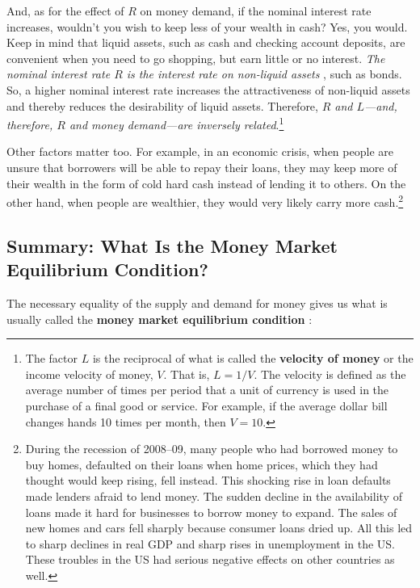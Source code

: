 \documentclass[
  letterpaper,
]{book}
\theoremstyle{plain}
\theoremstyle{remark}
\begin{document}
And, as for the effect of \(R\) on money demand, if the nominal interest
rate increases, wouldn't you wish to keep less of your wealth in cash?
Yes, you would. Keep in mind that liquid assets, such as cash and
checking account deposits, are convenient when you need to go shopping,
but earn little or no interest. \emph{The nominal interest rate \(R\) is
the interest rate on non-liquid assets} ,
such as bonds. So, a higher nominal interest rate increases the
attractiveness of non-liquid assets and thereby reduces the desirability
of liquid assets. Therefore, \emph{\(R\) and \(L\)---and, therefore,
\(R\) and money demand---are inversely related}.\footnote{The factor
  \(L\) is the reciprocal of what is called the \textbf{velocity of
  money} or the income velocity of money, \(V\). That is, \(L=1/V\). The
  velocity is defined as the average number of times per period that a
  unit of currency is used in the purchase of a final good or service.
  For example, if the average dollar bill changes hands 10 times per
  month, then \(V=10\).}

Other factors matter too. For example, in an economic crisis, when
people are unsure that borrowers will be able to repay their loans, they
may keep more of their wealth in the form of cold hard cash instead of
lending it to others. On the other hand, when people are wealthier, they
would very likely carry more cash.\footnote{During the recession of
  2008--09, many people who had borrowed money to buy homes, defaulted
  on their loans when home prices, which they had thought would keep
  rising, fell instead. This shocking rise in loan defaults made lenders
  afraid to lend money. The sudden decline in the availability of loans
  made it hard for businesses to borrow money to expand. The sales of
  new homes and cars fell sharply because consumer loans dried up. All
  this led to sharp declines in real GDP and sharp rises in unemployment
  in the US. These troubles in the US had serious negative effects on
  other countries as well.}

\subsection{Summary: What Is the Money Market Equilibrium
Condition?}\label{sec-summary-moneyeqm}

The necessary equality of the supply and demand for money gives us what
is usually called the \textbf{money market equilibrium condition}
:
\end{document}
